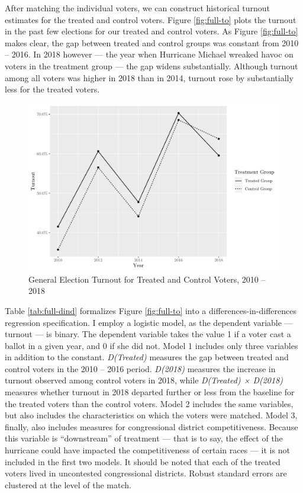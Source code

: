 \documentclass[
  12pt,
]{article}
\begin{document}
After matching the individual voters, we can construct historical turnout estimates for the treated and control voters. Figure \ref{fig:full-to} plots the turnout in the past few elections for our treated and control voters. As Figure \ref{fig:full-to} makes clear, the gap between treated and control groups was constant from 2010 -- 2016. In 2018 however --- the year when Hurricane Michael wreaked havoc on voters in the treatment group --- the gap widens substantially. Although turnout among all voters was higher in 2018 than in 2014, turnout rose by substantially less for the treated voters.

\begin{figure}[H]

{\centering \includegraphics{hurricane_michael_files/figure-latex/full-to-chunk-1} 

}

\caption{\label{fig:full-to}General Election Turnout for Treated and Control Voters, 2010 -- 2018}\label{fig:full-to-chunk}
\end{figure}

Table \ref{tab:full-dind} formalizes Figure \ref{fig:full-to} into a differences-in-differences regression specification. I employ a logistic model, as the dependent variable --- turnout --- is binary. The dependent variable takes the value 1 if a voter cast a ballot in a given year, and 0 if she did not. Model 1 includes only three variables in addition to the constant. \emph{D(Treated)} measures the gap between treated and control voters in the 2010 -- 2016 period. \emph{D(2018)} measures the increase in turnout observed among control voters in 2018, while \emph{D(Treated) × D(2018)} measures whether turnout in 2018 departed further or less from the baseline for the treated voters than the control voters. Model 2 includes the same variables, but also includes the characteristics on which the voters were matched. Model 3, finally, also includes measures for congressional district competitiveness. Because this variable is ``downstream'' of treatment --- that is to say, the effect of the hurricane could have impacted the competitiveness of certain races --- it is not included in the first two models. It should be noted that each of the treated voters lived in uncontested congressional districts. Robust standard errors are clustered at the level of the match.
\end{document}
